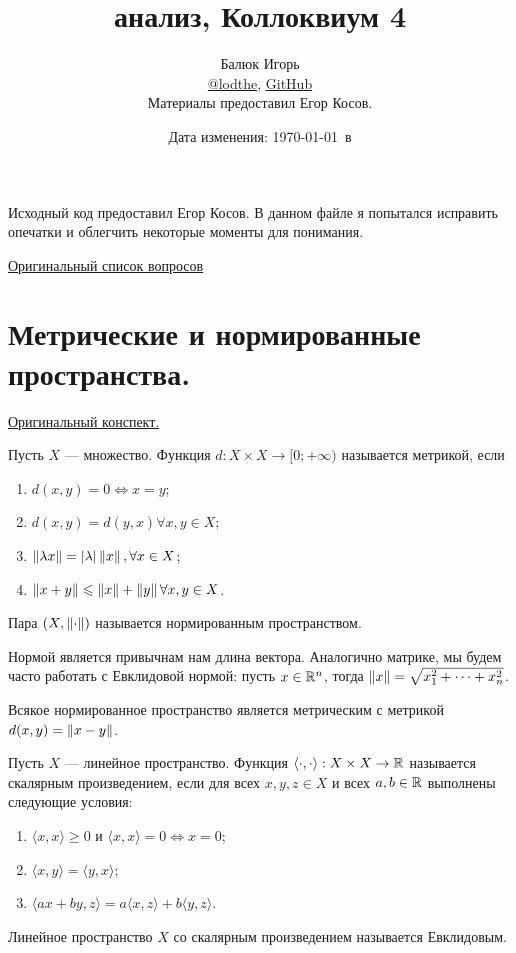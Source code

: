 \documentclass[a4paper]{article}
\title{\HugeМатематический анализ, Коллоквиум 4}
\author{
	Балюк Игорь \\
	\href{https://teleg.run/lodthe}{@lodthe},
    \href{https://github.com/LoDThe/hse-tex}{GitHub} \\
    Материалы предоставил Егор Косов.
}
\date{Дата изменения: \today \ в \currenttime}
\theoremstyle{named}
\begin{document}
    \maketitle

    \tableofcontents

    \newpage

    Исходный код предоставил Егор Косов. В данном файле я попытался исправить опечатки и облегчить некоторые моменты для понимания.

    \href{https://www.youtube.com/watch?v=dQw4w9WgXcQ}{Оригинальный список вопросов}

    \section{Метрические и нормированные пространства.}

    \href{https://www.dropbox.com/s/donysz87em9jfhs/%D0%9B%D0%B5%D0%BA%D1%86%D0%B8%D1%8F%208.pdf?dl=0}{Оригинальный конспект.}

    \begin{definition*}
        Пусть $X$ --- множество. Функция $d: X \times X \to [0; +\infty)$ называется метрикой, если
        \begin{enumerate}
        \item $d(x, y) = 0 \iff x = y$;
        \item $d(x, y) = d(y, x) \forall x, y \in X$;
        \item $\left\lVert\lambda x\right\rVert = |\lambda| \left\lVert x\right\rVert, \forall x \in X$;
        \item $\left\lVert x + y\right\rVert \leqslant \left\lVert x\right\rVert + \left\lVert y\right\rVert \forall x, y \in X$.
        \end{enumerate}

        Пара $(X, \left\lVert\cdot\right\rVert)$ называется нормированным пространством.
    \end{definition*}

    Нормой является привычнам нам длина вектора. Аналогично матрике, мы будем часто работать с Евклидовой нормой: пусть $x \in \mathbb{R}^n$, тогда $\left\lVert x\right\rVert = \sqrt{x_1^2 + \dots + x_n^2}$.

    Всякое нормированное пространство является метрическим с метрикой $d(x, y) = \left\lVert x - y\right\rVert$.

    \begin{definition*}
        Пусть $X$ --- линейное пространство. Функция $\langle \cdot, \cdot \rangle: X \times X \to \mathbb{R}$ называется скалярным произведением, если для всех $x, y, z \in X$ и всех $a, b \in \mathbb{R}$ выполнены следующие условия:
        \begin{enumerate}
        \item $\langle x, x \rangle \geq 0$ и $\langle x, x \rangle = 0 \iff x = 0$;
        \item $\langle x, y \rangle = \langle y, x \rangle$;
        \item $\langle ax + by, z \rangle = a \langle x, z \rangle + b \langle y, z \rangle$.
        \end{enumerate}

        Линейное пространство $X$ со скалярным произведением называется Евклидовым.
    \end{definition*}
\end{document}
